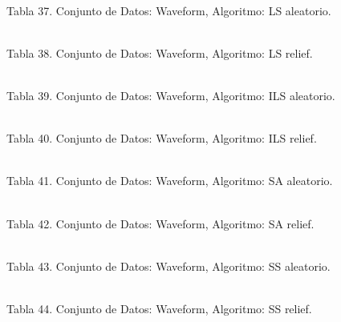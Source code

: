 \documentclass{ci5652}
\begin{document}
%
\\
Tabla 37. Conjunto de Datos: Waveform, Algoritmo: LS aleatorio.

%
\\
Tabla 38. Conjunto de Datos: Waveform, Algoritmo: LS relief.

%
\\
Tabla 39. Conjunto de Datos: Waveform, Algoritmo: ILS aleatorio.

%
\\
Tabla 40. Conjunto de Datos: Waveform, Algoritmo: ILS relief.

\begin{adjustbox}{width=\columnwidth, center=\columnwidth}
%
\\
\end{adjustbox}
Tabla 41. Conjunto de Datos: Waveform, Algoritmo: SA aleatorio.

\begin{adjustbox}{width=\columnwidth, center=\columnwidth}
%
\\
\end{adjustbox}
Tabla 42. Conjunto de Datos: Waveform, Algoritmo: SA relief.

\begin{adjustbox}{width=\columnwidth, center=\columnwidth}
%
\\
\end{adjustbox}
Tabla 43. Conjunto de Datos: Waveform, Algoritmo: SS aleatorio.

\begin{adjustbox}{width=\columnwidth, center=\columnwidth}
%
\\
\end{adjustbox}
Tabla 44. Conjunto de Datos: Waveform, Algoritmo: SS relief.
\end{document}
